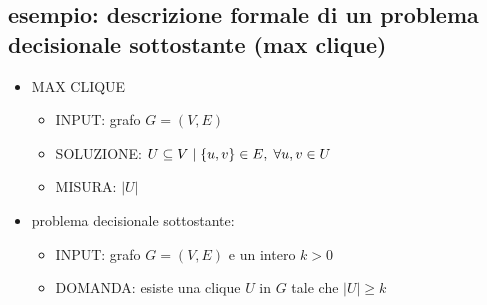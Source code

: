 \subsection*{esempio: descrizione formale di un problema decisionale sottostante (max clique)}
\begin{flushleft}
	\begin{itemize}
		\item MAX CLIQUE
		\begin{itemize}
			\item INPUT: grafo $G=(V,E)$
			\item SOLUZIONE: $U\subseteq V\hspace{0.1cm}\vert\hspace{0.1cm}\{u,v\}\in E,\hspace{0.1cm}\forall u,v\in U$
			\item MISURA: $|U|$
		\end{itemize}
		\item problema decisionale sottostante:
		\begin{itemize}
			\item INPUT: grafo $G=(V,E)$ e un intero $k>0$
			\item DOMANDA: esiste una clique $U$ in $G$ tale che $|U|\geq k$
		\end{itemize}
	\end{itemize}
\end{flushleft}


\subsection*{}
\begin{flushleft}
\end{flushleft}


\subsection*{}
\begin{flushleft}
\end{flushleft}


